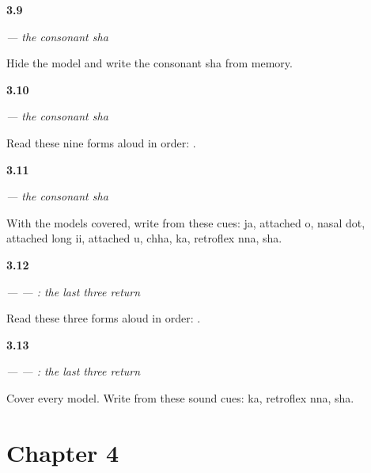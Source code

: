 \noindent\begin{minipage}[t]{\linewidth}
\raggedright
\hypertarget{review-GU-W03-sha-recall}{\textbf{3.9}} \emph{ — the consonant sha}\par
\small Hide the model and write the consonant sha from memory.
\end{minipage}\par\medskip

\noindent\begin{minipage}[t]{\linewidth}
\raggedright
\hypertarget{review-GU-W03-sha-doorway-reading}{\textbf{3.10}} \emph{ — the consonant sha}\par
\small Read these nine forms aloud in order:         .
\end{minipage}\par\medskip

\noindent\begin{minipage}[t]{\linewidth}
\raggedright
\hypertarget{review-GU-W03-sha-doorway-dictation}{\textbf{3.11}} \emph{ — the consonant sha}\par
\small With the models covered, write from these cues: ja, attached o, nasal dot, attached long ii, attached u, chha, ka, retroflex nna, sha.
\end{minipage}\par\medskip

\noindent\begin{minipage}[t]{\linewidth}
\raggedright
\hypertarget{review-GU-R03-doorway-three-r1-reading}{\textbf{3.12}} \emph{ —  — : the last three return}\par
\small Read these three forms aloud in order:   .
\end{minipage}\par\medskip

\noindent\begin{minipage}[t]{\linewidth}
\raggedright
\hypertarget{review-GU-R03-doorway-three-r1-dictation}{\textbf{3.13}} \emph{ —  — : the last three return}\par
\small Cover every model. Write from these sound cues: ka, retroflex nna, sha.
\end{minipage}\par\medskip

\section*{Chapter 4}

